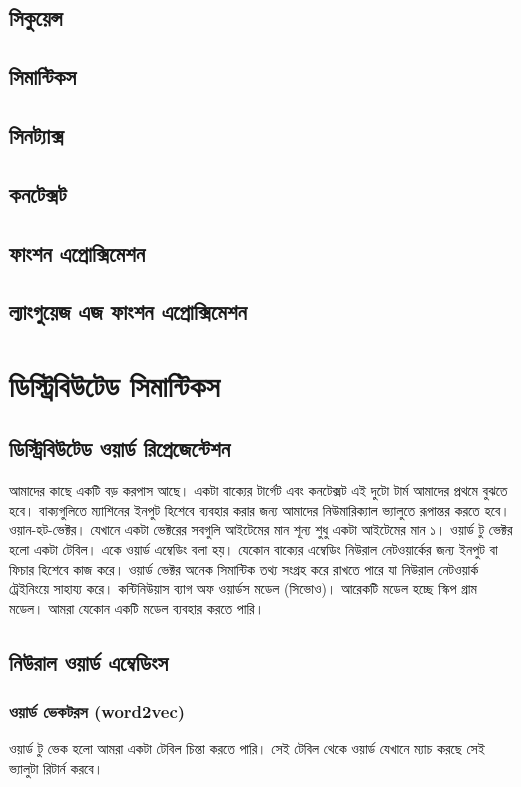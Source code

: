 \documentclass{article}[book]
\begin{document}
\subsection{সিকুয়েন্স} 
\subsection{সিমান্টিকস} 
\subsection{সিনট্যাক্স}
\subsection{কনটেক্সট}
\subsection{ফাংশন এপ্রোক্সিমেশন}
\subsection{ল্যাংগুয়েজ এজ ফাংশন এপ্রোক্সিমেশন} 
 
 
\section{ডিস্ট্রিবিউটেড সিমান্টিকস}
\subsection{ডিস্ট্রিবিউটেড ওয়ার্ড রিপ্রেজেন্টেশন}
আমাদের কাছে একটি বড় করপাস আছে। একটা বাক্যের টার্গেট এবং কনটেক্সট এই দুটো টার্ম আমাদের প্রথমে বুঝতে হবে। 
বাক্যগুলিতে  ম্যাশিনের ইনপুট হিশেবে ব্যবহার করার জন্য আমাদের নিউমারিক্যাল ভ্যালুতে রূপান্তর করতে হবে। 
ওয়ান-হট-ভেক্টর। যেখানে একটা ভেক্টরের সবগুলি আইটেমের মান শূন্য শুধু একটা আইটেমের মান ১। ওয়ার্ড টু ভেক্টর হলো একটা টেবিল। 
একে ওয়ার্ড এম্বেডিং বলা হয়। যেকোন বাক্যের এম্বেডিং নিউরাল নেটওয়ার্কের জন্য ইনপুট বা ফিচার হিশেবে কাজ করে।
ওয়ার্ড ভেক্টর অনেক সিমান্টিক তথ্য সংগ্রহ করে রাখতে পারে যা নিউরাল নেটওয়ার্ক ট্রেইনিংয়ে সাহায্য করে।
কন্টিনিউয়াস ব্যাগ অফ ওয়ার্ডস মডেল (সিভোও)। আরেকটি মডেল হচ্ছে স্কিপ গ্রাম মডেল। আমরা যেকোন একটি মডেল ব্যবহার করতে পারি। 
 
 \subsection{নিউরাল ওয়ার্ড এম্বেডিংস}
\subsubsection{ওয়ার্ড ভেকটরস (word2vec) }
ওয়ার্ড টু ভেক হলো আমরা একটা টেবিল চিন্তা করতে পারি। সেই টেবিল থেকে ওয়ার্ড যেখানে ম্যাচ করছে সেই ভ্যালুটা রিটার্ন করবে। 
\end{document}
